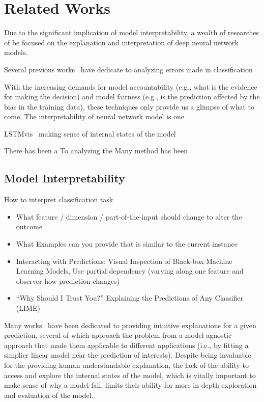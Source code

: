 
\section{Related Works}
Due to the significant implication of model interpretability, a wealth of researches of be focused on the explanation and interpretation of deep neural network models.

Several previous works~\cite{BilalJourablooYe2018} have dedicate to analyzing errors made in classification

With the increasing demands for model accountability (e.g., what is the evidence for making the decision) and model fairness (e.g., is the prediction affected by the bias in the training data), these techniques only provide us a glimpse of what to come. The interpretability of neural network model is one

LSTMvis~\cite{StrobeltGehrmannHuber2016} making sense of internal states of the model

There has been a
To analyzing the
Many method has been


\subsection{Model Interpretability}

How to interpret classification task
\begin{itemize}
    \item What feature / dimension / part-of-the-input should change to
    alter the outcome
    \item What Examples can you provide that is similar to the current
    instance
\end{itemize}
\begin{itemize}
    \item Interacting with Predictions: Visual Inspection of Black-box Machine Learning Models,
    Use partial dependency (varying along one feature and observer how prediction changes)
    \item “Why Should I Trust You?” Explaining the Predictions of Any Classifier (LIME)
\end{itemize}
%
Many works~\cite{RibeiroSinghGuestrin2016} have been dedicated to providing intuitive explanations for a given prediction, several of which approach the problem from a model agnostic approach that made them applicable to different applications (i.e., by fitting a simplier linear model near the prediction of interests).
%
Despite being invaluable for the providing human understandable explanation, the lack of the ability to access and explore the internal states of the model, which is vitally important to make sense of why a model fail, limits their ability for more in depth exploration and evaluation of the model.


